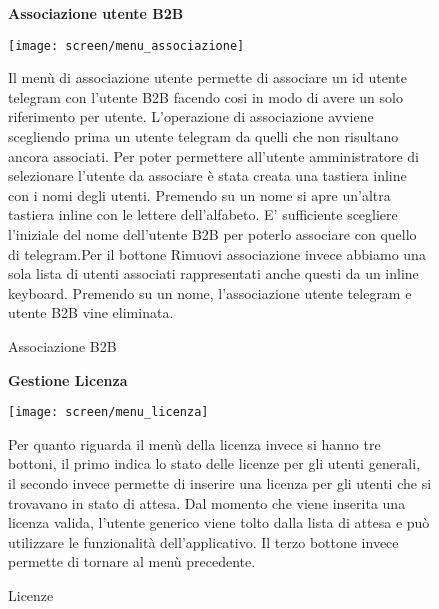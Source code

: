 \begin{figure}[h!]
   \begin{center}
   \textbf{Associazione utente B2B}\\
   \end{center}
   \begin{center}
    \texttt{[image: screen/menu\_associazione]} 
    \caption{Associazione B2B}
    \end{center}
     Il menù di associazione utente permette di associare un id utente telegram con l’utente B2B facendo cosi in modo di avere un solo riferimento per utente. L’operazione di associazione avviene scegliendo prima un utente telegram da quelli che non risultano ancora associati. Per poter permettere all’utente amministratore di selezionare l’utente da associare è stata creata una tastiera inline con i nomi degli utenti. Premendo su un nome  si apre un’altra tastiera inline con le lettere dell’alfabeto. E’ sufficiente scegliere l’iniziale del nome dell’utente B2B per poterlo associare con quello di telegram.Per il bottone Rimuovi associazione invece abbiamo una sola lista di utenti associati rappresentati anche questi da un inline keyboard. Premendo su un nome, l’associazione utente telegram e utente B2B vine eliminata. 

\end{figure}  



\begin{figure}[h!]
   \begin{center}
   \textbf{Gestione Licenza}\\
   \end{center}
   \begin{center}
    \texttt{[image: screen/menu\_licenza]} 
    \caption{Licenze}
    \end{center}
   Per quanto riguarda il menù della licenza invece si hanno tre bottoni, il primo indica lo stato delle licenze per gli utenti generali, il secondo invece permette di inserire una licenza per gli utenti che si trovavano in stato di attesa. Dal momento che viene inserita una licenza valida, l’utente generico viene tolto dalla lista di attesa e può utilizzare le funzionalità dell’applicativo. Il terzo bottone invece permette di tornare al menù precedente.

\end{figure}  





